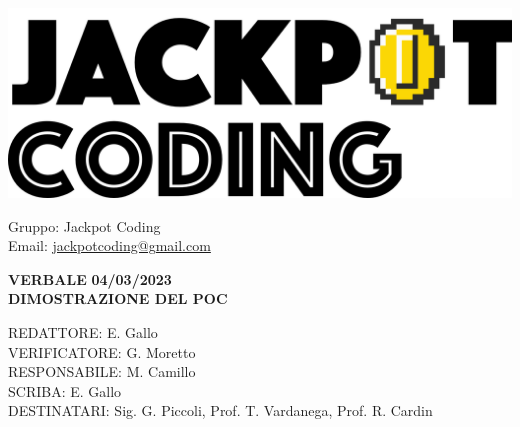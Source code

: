 \documentclass[5pt]{article}
\begin{document}
\begin{minipage}[t]{0.50\textwidth}
    \begin{flushleft}
        \hspace{10pt}
        \includegraphics[scale=0.65]{jackpot-logo.png} 
    \end{flushleft}
\end{minipage}
\hspace{-60pt} %
\begin{flushright}
    \begin{minipage}[t]{0.50\textwidth}
        \begin{flushright}
            Gruppo: {\Large Jackpot Coding}\\
            Email: \href{mailto:jackpotcoding@gmail.com}{jackpotcoding@gmail.com}
        \end{flushright}
    \end{minipage}
\end{flushright}

\vspace{20pt}

\begin{center}
    \textbf{\large VERBALE }
    \textbf{\large 04/03/2023} \\
    \textbf{\LARGE DIMOSTRAZIONE DEL POC}
\end{center}

\vspace{13pt}

\begin{flushleft}
    \begin{spacing}{1.5}
        REDATTORE: E. Gallo\\ 
        VERIFICATORE: G. Moretto\\ 
        RESPONSABILE: M. Camillo\\ 
        \vspace{7pt}
        SCRIBA: E. Gallo\\ 
        \vspace{7pt}
        DESTINATARI: Sig. G. Piccoli, Prof. T. Vardanega, Prof. R. Cardin\\ 
    \end{spacing}
\end{flushleft}
\end{document}
